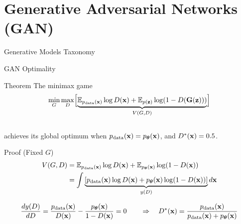 \documentclass{beamer}
\renewcommand{\eqpause}{}
\renewcommand{\nextonslide}[1]{#1}
\begin{document}
\section{Generative Adversarial Networks (GAN)}
\begin{frame}{Generative Models Taxonomy}
\end{frame}
\begin{frame}{GAN Optimality}
	\begin{block}{Theorem}
		The minimax game
		\vspace{-0.3cm}
		\[
			\min_{G} \max_D \Bigl[ \underbrace{\mathbb{E}_{p_{\text{data}}(\mathbf{x})} \log D(\mathbf{x}) + \mathbb{E}_{p(\mathbf{z})} \log (1 - D(\mathbf{G}(\mathbf{z})))}_{V(G, D)} \Bigr]
		\]
		\vspace{-0.5cm} \\
		achieves its global optimum when $p_{\text{data}}(\mathbf{x}) = p_{\boldsymbol{\theta}}(\mathbf{x})$, and $D^*(\mathbf{x}) = 0.5$.
	\end{block}
	\eqpause
	\begin{block}{Proof (Fixed $G$)}
		\vspace{-0.5cm}
		\begin{align*}
			V(G, D) &= \bbE_{\pd(\bx)} \log D(\bx) + \bbE_{\pt(\bx)} \log (1 - D(\bx)) \\
			\nextonslide{&= \int \underbrace{\left[ \pd(\bx) \log D(\bx) + \pt(\bx)\log (1 - D(\bx)) \right]}_{y(D)} d \bx}
		\end{align*}
		\eqpause
		\vspace{-0.2cm}
		\[
			\frac{d y(D)}{d D} = \frac{p_{\text{data}}(\mathbf{x})}{D(\mathbf{x})} - \frac{p_{\boldsymbol{\theta}}(\mathbf{x})}{1 - D(\mathbf{x})} = 0 \qquad \Rightarrow \quad D^*(\mathbf{x}) = \frac{p_{\text{data}}(\mathbf{x})}{p_{\text{data}}(\mathbf{x}) + p_{\boldsymbol{\theta}}(\mathbf{x})}
		\]
	\end{block}
\end{frame}
\end{document}
